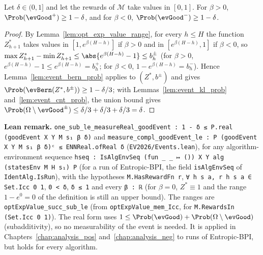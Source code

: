\begin{lemma}\label{lem:good_event}
\leanok
{}
Let $\delta \in (0, 1]$ and let the rewards of $\mathcal M$ take values in $[0, 1]$. For $\beta > 0$,
$\Prob(\evGood^+) \ge 1 - \delta$, and for $\beta < 0$, $\Prob(\evGood^-) \ge 1 - \delta$.
\end{lemma}

\begin{proof}
\leanok
By Lemma~\ref{lem:opt_exp_value_range}, for every $h \le H$ the function $Z^*_{h+1}$ takes values
in $[1, e^{\beta(H - h)}]$ if $\beta > 0$ and in $[e^{\beta(H - h)}, 1]$ if $\beta < 0$, so
$\max Z^*_{h+1} - \min Z^*_{h+1} \le \abs{e^{\beta(H - h)} - 1} \le b^\pm_h$ (for $\beta > 0$,
$e^{\beta(H-h)} - 1 \le e^{\beta(H - h)} = b^+_h$; for $\beta < 0$, $1 - e^{\beta(H-h)} = b^-_h$). Hence
Lemma~\ref{lem:event_bern_prob} applies to $(Z^*, b^\pm)$ and gives
$\Prob(\evBern(Z^*, b^\pm)) \ge 1 - \delta/3$; with Lemmas~\ref{lem:event_kl_prob}
and~\ref{lem:event_cnt_prob}, the union bound gives
$\Prob(\Omega \setminus \evGood^\pm) \le \delta/3 + \delta/3 + \delta/3 = \delta$.
\end{proof}

\textbf{Lean remark.} \texttt{one\_sub\_le\_measureReal\_goodEvent : 1 - δ ≤ P.real (goodEvent X Y M s₁ β δ)}
and \texttt{measure\_compl\_goodEvent\_le : P (goodEvent X Y M s₁ β δ)ᶜ ≤ ENNReal.ofReal δ}
(\texttt{EV2026/Events.lean}), for any algorithm-environment sequence
\texttt{hseq : IsAlgEnvSeq (fun \_ \_ ↦ ()) X Y alg (statesEnv M H s₁) P} (for a run of Entropic-BPI,
the field \texttt{isAlgEnvSeq} of \texttt{IdentAlg.IsRun}), with the hypotheses
\texttt{M.HasRewardFn r}, \texttt{∀ h s a, r h s a ∈ Set.Icc 0 1}, \texttt{0 < δ}, \texttt{δ ≤ 1} and
every \texttt{β : ℝ} (for $\beta = 0$, $Z^* \equiv 1$ and the range $1 - e^0 = 0$ of the definition is
still an upper bound). The ranges are \texttt{optExpValue\_succ\_sub\_le} (from
\texttt{optExpValue\_mem\_Icc}, for \texttt{M.RewardsIn (Set.Icc 0 1)}). The real form uses
$1 \le \Prob(\evGood) + \Prob(\Omega \setminus \evGood)$ (subadditivity), so no measurability of
the event is needed. It is applied in Chapters~\ref{chap:analysis_pos}
and~\ref{chap:analysis_neg} to runs of Entropic-BPI, but holds for every algorithm.
